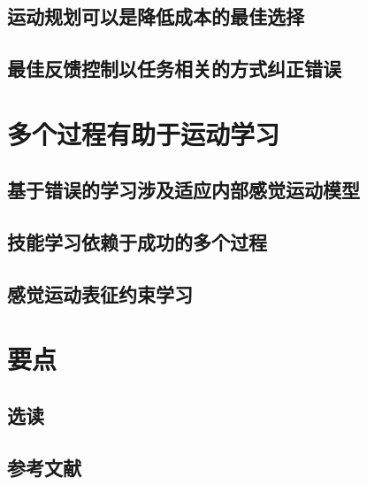 \subsection{运动规划可以是降低成本的最佳选择}
\subsection{最佳反馈控制以任务相关的方式纠正错误}

\section{多个过程有助于运动学习}
\subsection{基于错误的学习涉及适应内部感觉运动模型}
\subsection{技能学习依赖于成功的多个过程}
\subsection{感觉运动表征约束学习}

\section{要点}
\subsection{选读}
\subsection{参考文献}

